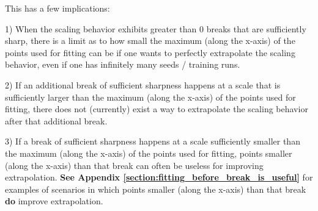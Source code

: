 \documentclass{article} %
\begin{document}




\clearpage

\vspace*{-15.11mm}

This has a few implications:

\vspace{-1.68mm}

1) When the scaling behavior exhibits greater than 0 breaks that are sufficiently sharp, there is a limit as to how small the maximum (along the x-axis) of the points used for fitting can be if one wants to perfectly extrapolate the scaling behavior, even if one has infinitely many seeds / training runs.

\vspace{-1.68mm}

2) If an additional break of sufficient sharpness happens at a scale that is sufficiently larger than the maximum (along the x-axis) of the points used for fitting, there does not (currently) exist a way to extrapolate the scaling behavior after that additional break.

\vspace{-1.68mm}

3) If a break of sufficient sharpness happens at a scale sufficiently smaller than the maximum (along the x-axis) of the points used for fitting, points smaller (along the x-axis) than that break can often be useless for improving extrapolation. \textbf{See Appendix \ref{section:fitting_before_break_is_useful}} for examples of scenarios in which points smaller (along the x-axis) than that break \textbf{do} improve extrapolation.


\end{document}
